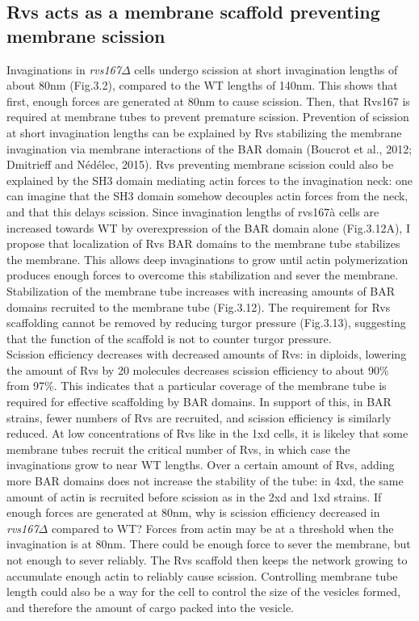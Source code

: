 \documentclass[9pt,lineno]{elife}
\begin{document}
\subsection{Rvs acts as a membrane scaffold preventing membrane scission}
Invaginations in \textit{rvs167$\Delta$} cells undergo scission at short invagination lengths of about 80nm (Fig.3.2), compared to the WT lengths of 140nm. This shows that first, enough forces are generated at 80nm to cause scission. Then, that Rvs167 is required at membrane tubes to prevent premature scission. Prevention of scission at short invagination lengths can be explained by Rvs stabilizing the membrane invagination via membrane interactions of the BAR domain (Boucrot et al., 2012; Dmitrieff and Nédélec, 2015). Rvs preventing membrane scission could also be explained by the SH3 domain mediating actin forces to the invagination neck: one can imagine that the SH3 domain somehow decouples actin forces from the neck, and that this delays scission. Since invagination lengths of rvs167à cells are increased towards WT by overexpression of the BAR domain alone (Fig.3.12A), I propose that localization of Rvs BAR domains to the membrane tube stabilizes the membrane. This allows deep invaginations to grow until actin polymerization produces enough forces to overcome this stabilization and sever the membrane. Stabilization of the membrane tube increases with increasing amounts of BAR domains recruited to the membrane tube (Fig.3.12). The requirement for Rvs scaffolding cannot be removed by reducing turgor pressure (Fig.3.13), suggesting that the function of the scaffold is not to counter turgor pressure. 
~\\ 

Scission efficiency decreases with decreased amounts of Rvs: in diploids, lowering the amount of Rvs by 20 molecules decreases scission efficiency to about 90\% from 97\%. This indicates that a particular coverage of the membrane tube is required for effective scaffolding by BAR domains. In support of this, in BAR strains, fewer numbers of Rvs are recruited, and scission efficiency is similarly reduced. At low concentrations of Rvs like in the 1xd cells, it is likeley that some membrane tubes recruit the critical number of Rvs, in which case the invaginations grow to near WT lengths. Over a certain amount of Rvs, adding more BAR domains does not increase the stability of the tube: in 4xd, the same amount of actin is recruited before scission as in the 2xd and 1xd strains.
If enough forces are generated at 80nm, why is scission efficiency decreased in \textit{rvs167$\Delta$} compared to WT? Forces from actin may be at a threshold when the invagination is at 80nm. There could be enough force to sever the membrane, but not enough to sever reliably. The Rvs scaffold then keeps the network growing to accumulate enough actin to reliably cause scission. Controlling membrane tube length could also be a way for the cell to control the size of the vesicles formed, and therefore the amount of cargo packed into the vesicle.
\end{document}
